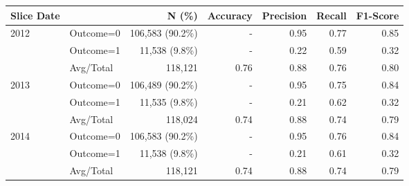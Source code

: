 \begin{tabular}{llrrrrr} \toprule
Slice Date  & & N (\%)    & Accuracy & Precision   & Recall & F1-Score \\ \midrule
2012 & Outcome=0 & 106,583 (90.2\%) & - & 0.95 & 0.77 & 0.85 \\
     & Outcome=1 & 11,538 (9.8\%) & - & 0.22 & 0.59 & 0.32 \\
     & Avg/Total & 118,121 & 0.76 & 0.88 & 0.76 & 0.80 \\
2013 & Outcome=0 & 106,489 (90.2\%) & - & 0.95 & 0.75 & 0.84 \\
     & Outcome=1 & 11,535 (9.8\%) & - & 0.21 & 0.62 & 0.32 \\
     & Avg/Total & 118,024 & 0.74 & 0.88 & 0.74 & 0.79 \\
2014 & Outcome=0 & 106,583 (90.2\%) & - & 0.95 & 0.76 & 0.84 \\
     & Outcome=1 & 11,538 (9.8\%) & - & 0.21 & 0.61 & 0.32 \\
     & Avg/Total & 118,121 & 0.74 & 0.88 & 0.74 & 0.79 \\
\bottomrule \end{tabular}
